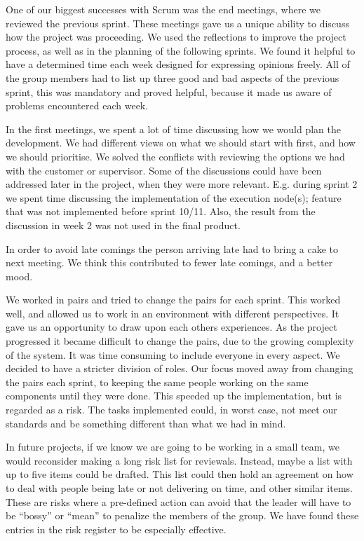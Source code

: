 One of our biggest successes with Scrum was the end meetings, where we
reviewed the previous sprint. These meetings gave us a unique ability
to discuss how the project was proceeding. We used the reflections to
improve the project process, as well as in the planning of the
following sprints. We found it helpful to have a determined time each
week designed for expressing opinions freely. All of the group members
had to list up three good and bad aspects of the previous sprint, this
was mandatory and proved helpful, because it made us aware of problems
encountered each week. 

In the first meetings, we spent a lot of time discussing how we would
plan the development. We had different views on what we should start
with first, and how we should prioritise. We solved the conflicts with
reviewing the options we had with the customer or supervisor. Some of
the discussions could have been addressed later in the project, when
they were more relevant. E.g. during sprint 2 we spent time discussing
the implementation of the execution node(s); feature that was not
implemented before sprint 10/11. Also, the result from the discussion
in week 2 was not used in the final product. \ 

In order to avoid late comings the person arriving late had to bring a
cake to next meeting. We think this contributed to fewer late comings,
and a better mood.

We worked in pairs and tried to change the pairs for each sprint. This
worked well, and allowed us to work in an environment with different
perspectives. It gave us an opportunity to draw upon each others
experiences. As the project progressed it became difficult to change
the pairs, due to the growing complexity of the system. It was time
consuming to include everyone in every aspect. We decided to have a
stricter division of roles. Our focus moved away from changing the
pairs each sprint, to keeping the same people working on the same
components until they were done. This speeded up the implementation,
but is regarded as a risk. The tasks implemented could, in worst case,
not meet our standards and be something different than what we had in
mind. 

In future projects, if we know we are going to be working in a small
team, we would reconsider making a long risk list for reviewals.
Instead, maybe a list with up to five items could be drafted. This list
could then hold an agreement on how to deal with people being late or
not delivering on time, and other similar items. These are risks where
a pre-defined action can avoid that the leader will have to be
``bossy'' or
``mean'' to penalize the members of
the group. We have found these entries in the risk register to be
especially effective. 

